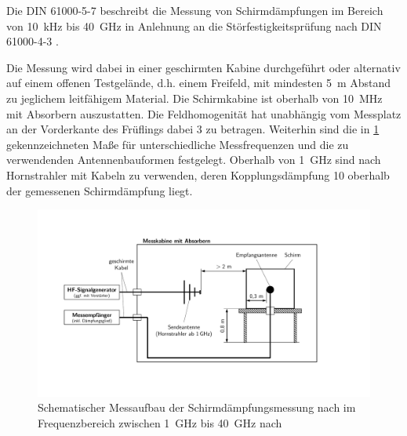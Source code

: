 Die DIN 61000-5-7 \cite{DIN_EN_61000-5-7} beschreibt die Messung von Schirmdämpfungen im Bereich von \SI{10}{\kilo\hertz} bis \SI{40}{\giga\hertz} in Anlehnung an die Störfestigkeitsprüfung nach DIN 61000-4-3 \cite{DIN_EN_61000-4-3}.
\par
\vspace{\linespace}
Die Messung wird dabei in einer geschirmten Kabine durchgeführt oder alternativ auf einem offenen Testgelände, d.h. einem Freifeld, mit mindesten \SI{5}{\meter} Abstand zu jeglichem leitfähigem Material. Die Schirmkabine ist oberhalb von \SI{10}{\mega\hertz} mit Absorbern auszustatten. Die Feldhomogenität hat unabhängig vom Messplatz an der Vorderkante des Früflings dabei \SI{3}{\Dezibel} zu betragen. Weiterhin sind die in \Abb\ref{fig:2_Schematik_Schirmdaempfungsmessung_DIN_61000-5-7} gekennzeichneten Maße für unterschiedliche Messfrequenzen und die zu verwendenden Antennenbauformen festgelegt. Oberhalb von \SI{1}{\giga\hertz} sind nach~\cite{DIN_EN_61000-5-7} Hornstrahler mit Kabeln zu verwenden, deren Kopplungsdämpfung \SI{10}{\Dezibel} oberhalb der gemessenen Schirmdämpfung liegt.


\begin{figure}[ht]
    \centering
    \includegraphics[page = 1, trim = 2cm 3cm 5cm 3cm, clip, width=.9\textwidth]{Abbildungen/Kapitel2/Schematiken_Schirmdaempfungsmessung.pdf}
    \caption[Schematischer Messaufbau der Schirmdämpfungsmessung nach \citeauthor{DIN_EN_61000-5-7} im Frequenzbereich zwischen \SI{1}{\giga\hertz} bis \SI{40}{\giga\hertz}]{Schematischer Messaufbau der Schirmdämpfungsmessung nach \citeauthor{DIN_EN_61000-5-7} im Frequenzbereich zwischen \SI{1}{\giga\hertz} bis \SI{40}{\giga\hertz} nach~\cite{DIN_EN_61000-5-7}}
    \label{fig:2_Schematik_Schirmdaempfungsmessung_DIN_61000-5-7}
\end{figure}



